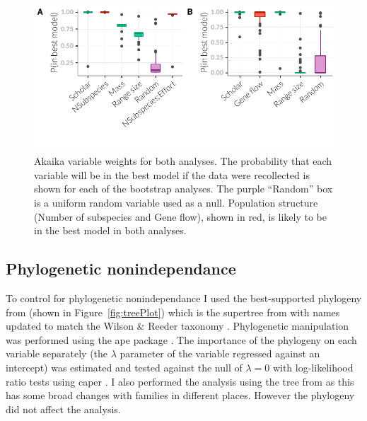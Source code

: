 \begin{knitrout}\footnotesize
{}\color{fgcolor}\begin{figure}[t]

{\centering \includegraphics[width=\textwidth,trim = 0 1cm 0 0]{figure/fstITPlots-1} 

}

\caption[Akaika variable weights for $F_{ST}$ analysis.]{Akaika variable weights for both analyses. The probability that each variable will be in the best model if the data were recollected is shown for each of the bootstrap analyses. The purple ``Random'' box is a uniform random variable used as a null. Population structure (Number of subspecies and Gene flow), shown in red, is likely to be in the best model in both analyses.}\label{fig:fstITPlots}
\end{figure}


\end{knitrout}


\subsection{Phylogenetic nonindependance}

To control for phylogenetic nonindependance I used the best-supported phylogeny from \textcite{fritz2009geographical} (shown in Figure~\ref{fig:treePlot}) which is the supertree from \cite{bininda2007delayed} with names updated to match the Wilson \& Reeder taxonomy \cite{wilson2005mammal}.
Phylogenetic manipulation was performed using the ape package \cite{ape}.
The importance of the phylogeny on each variable separately (the $\lambda$ parameter of the variable regressed against an intercept) was estimated and tested against the null of $\lambda = 0$ with log-likelihood ratio tests using caper \cite{caper}.
I also performed the analysis using the tree from \cite{jones2005bats} as this has some broad changes with families in different places.
However the phylogeny did not affect the analysis.

